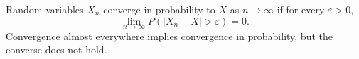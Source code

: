 Random variables $X_n$ converge in probability to $X$ as $n \to \infty$ if for every $\varepsilon > 0$,
$$\lim_{n \to \infty} P(|X_n - X| > \varepsilon) = 0.$$
Convergence almost everywhere implies convergence in probability, but the converse does not hold.
